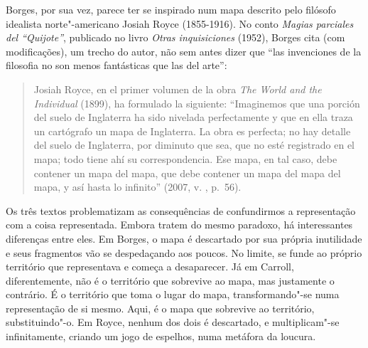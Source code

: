 Borges, por sua vez, parece ter se inspirado num mapa descrito pelo
filósofo idealista norte"-americano Josiah Royce (1855-1916). No conto
\emph{Magias parciales del ``Quijote''}, publicado no livro \emph{Otras
inquisiciones} (1952), Borges cita (com modificações), um trecho do
autor, não sem antes dizer que ``las invenciones de la filosofia no son
menos fantásticas que las del arte'':

\begin{quote}
Josiah Royce, en el primer volumen de la obra \emph{The World and the
Individual} (1899), ha formulado la siguiente: ``Imaginemos que una
porción del suelo de Inglaterra ha sido nivelada perfectamente y que en
ella traza un cartógrafo un mapa de Inglaterra. La obra es perfecta; no
hay detalle del suelo de Inglaterra, por diminuto que sea, que no esté
registrado en el mapa; todo tiene ahí su correspondencia. Ese mapa, en
tal caso, debe contener un mapa del mapa, que debe contener un mapa del
mapa del mapa, y así hasta lo infinito'' (2007, v. , p.~56).
\end{quote}

Os três textos problematizam as consequências de confundirmos a
representação com a coisa representada. Embora tratem do mesmo paradoxo,
há interessantes diferenças entre eles. Em Borges, o mapa é descartado
por sua própria inutilidade e seus fragmentos vão se despedaçando aos
poucos. No limite, se funde ao próprio território que representava e
começa a desaparecer. Já em Carroll, diferentemente, não é o território
que sobrevive ao mapa, mas justamente o contrário. É o território que
toma o lugar do mapa, transformando"-se numa representação de si
mesmo. Aqui, é o mapa que sobrevive ao território, substituindo"-o. Em
Royce, nenhum dos dois é descartado, e multiplicam"-se infinitamente,
criando um jogo de espelhos, numa metáfora da loucura.

